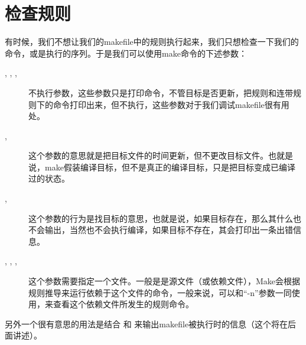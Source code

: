 \documentclass[a4paper,10pt]{sphinxmanual}
\begin{document}
\section{检查规则}
\label{\detokenize{invoke:id3}}
有时候，我们不想让我们的makefile中的规则执行起来，我们只想检查一下我们的命令，或是执行的序列。于是我们可以使用make命令的下述参数：
\begin{description}
\item[{, , , }] \leavevmode
不执行参数，这些参数只是打印命令，不管目标是否更新，把规则和连带规则下的命令打印出来，但不执行，这些参数对于我们调试makefile很有用处。

\item[{, }] \leavevmode
这个参数的意思就是把目标文件的时间更新，但不更改目标文件。也就是说，make假装编译目标，但不是真正的编译目标，只是把目标变成已编译过的状态。

\item[{, }] \leavevmode
这个参数的行为是找目标的意思，也就是说，如果目标存在，那么其什么也不会输出，当然也不会执行编译，如果目标不存在，其会打印出一条出错信息。

\item[{, , , }] \leavevmode
这个参数需要指定一个文件。一般是是源文件（或依赖文件），Make会根据规则推导来运行依赖于这个文件的命令，一般来说，可以和“-n”参数一同使用，来查看这个依赖文件所发生的规则命令。

\end{description}

另外一个很有意思的用法是结合  和  来输出makefile被执行时的信息（这个将在后面讲述）。
\end{document}
